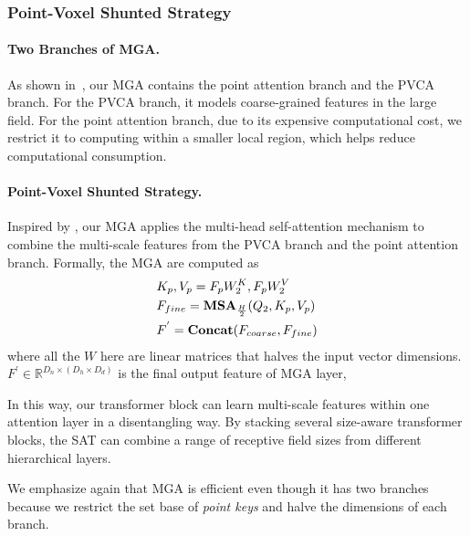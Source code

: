 \documentclass[10pt,twocolumn,letterpaper]{article}
\begin{document}
\subsubsection{Point-Voxel Shunted Strategy} \label{sec-pvshunt}
\paragraph{Two Branches of MGA.}As shown in~, our MGA contains the point attention branch and the PVCA branch. For the PVCA branch, it models coarse-grained features in the large field. For the point attention branch, due to its expensive computational cost, we restrict it to computing within a smaller local region, which helps reduce computational consumption.

\paragraph{Point-Voxel Shunted Strategy.}Inspired by \cite{shunted2d2022}, our MGA applies the multi-head self-attention mechanism to combine the multi-scale features from the PVCA branch and the point attention branch. Formally, the MGA are computed as
\begin{equation}
\begin{split}\label{equa-MGA}
& K_p, V_p = F_p {W}_2^K, F_p {W}_2^V\\
& F_{fine} = {\rm \textbf{MSA}}_{\frac{H}{2}}(Q_2, K_p, V_p) \\
& F^{'} = {\rm \textbf{Concat}}(F_{coarse}, F_{fine})
\end{split}
\end{equation}
where all the $W$ here are linear matrices that halves the input vector dimensions. $F^{'} \in \mathbb{R}^{D_n\times(D_h\times D_d)}$ is the final output feature of MGA layer,  


In this way, our transformer block can learn multi-scale features within one attention layer in a disentangling way. By stacking several size-aware transformer blocks, the SAT can combine a range of receptive field sizes from different hierarchical layers. 

We emphasize again that MGA is efficient even though it has two branches because we restrict the set base of \textit{point keys} and halve the dimensions of each branch.
\end{document}
